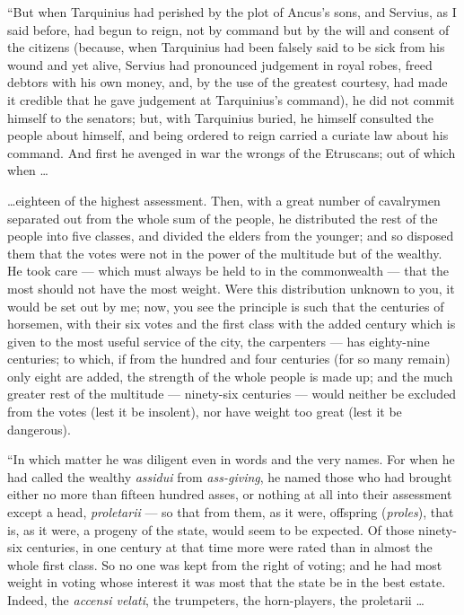 ``But when Tarquinius had perished by the plot of Ancus's sons, and Servius, as I said before, had begun to reign, not by command but by the will and consent of the citizens (because, when Tarquinius had been falsely said to be sick from his wound and yet alive, Servius had pronounced judgement in royal robes, freed debtors with his own money, and, by the use of the greatest courtesy, had made it credible that he gave judgement at Tarquinius's command), he did not commit himself to the senators; but, with Tarquinius buried, he himself consulted the people about himself, and being ordered to reign carried a curiate law about his command. And first he avenged in war the wrongs of the Etruscans; out of which when \ldots

 \ldots eighteen of the highest assessment. Then, with a great number of cavalrymen separated out from the whole sum of the people, he distributed the rest of the people into five classes, and divided the elders from the younger; and so disposed them that the votes were not in the power of the multitude but of the wealthy. He took care --- which must always be held to in the commonwealth --- that the most should not have the most weight. Were this distribution unknown to you, it would be set out by me; now, you see the principle is such that the centuries of horsemen, with their six votes and the first class with the added century which is given to the most useful service of the city, the carpenters --- has eighty-nine centuries; to which, if from the hundred and four centuries (for so many remain) only eight are added, the strength of the whole people is made up; and the much greater rest of the multitude --- ninety-six centuries --- would neither be excluded from the votes (lest it be insolent), nor have weight too great (lest it be dangerous).

 ``In which matter he was diligent even in words and the very names. For when he had called the wealthy \textit{assidui} from \textit{ass-giving}, he named those who had brought either no more than fifteen hundred asses, or nothing at all into their assessment except a head, \textit{proletarii} --- so that from them, as it were, offspring (\textit{proles}), that is, as it were, a progeny of the state, would seem to be expected. Of those ninety-six centuries, in one century at that time more were rated than in almost the whole first class. So no one was kept from the right of voting; and he had most weight in voting whose interest it was most that the state be in the best estate. Indeed, the \textit{accensi velati}, the trumpeters, the horn-players, the proletarii \ldots

